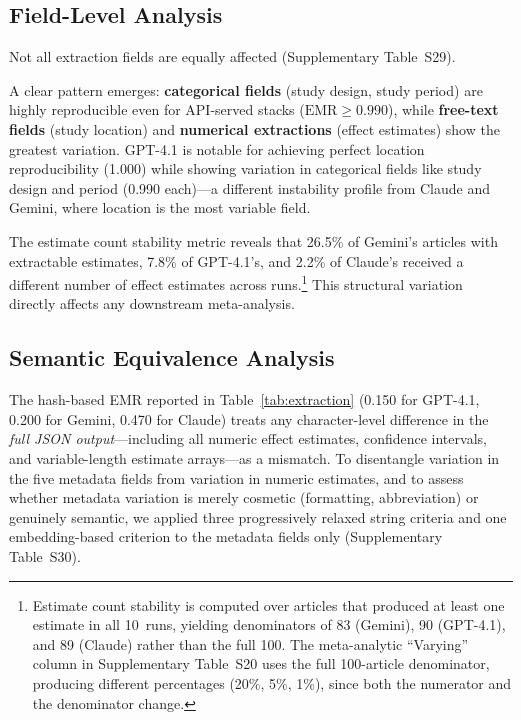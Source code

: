 \documentclass[preprint,review,12pt,authoryear]{elsarticle}
\newcommand{\emr}{\textrm{EMR}}
\begin{document}
\subsection{Field-Level Analysis}
\label{sec:fieldlevel}

Not all extraction fields are equally affected (Supplementary Table~S29).


\noindent A clear pattern emerges: \textbf{categorical fields} (study design, study period) are highly reproducible even for API-served stacks ($\emr{\geq}0.990$), while \textbf{free-text fields} (study location) and \textbf{numerical extractions} (effect estimates) show the greatest variation.
GPT-4.1 is notable for achieving perfect location reproducibility (1.000) while showing variation in categorical fields like study design and period (0.990 each)---a different instability profile from Claude and Gemini, where location is the most variable field.

The estimate count stability metric reveals that 26.5\% of Gemini's articles with extractable estimates, 7.8\% of GPT-4.1's, and 2.2\% of Claude's received a different number of effect estimates across runs.\footnote{Estimate count stability is computed over articles that produced at least one estimate in all 10~runs, yielding denominators of 83 (Gemini), 90 (GPT-4.1), and 89 (Claude) rather than the full 100. The meta-analytic ``Varying'' column in Supplementary Table~S20 uses the full 100-article denominator, producing different percentages (20\%, 5\%, 1\%), since both the numerator and the denominator change.}
This structural variation directly affects any downstream meta-analysis.

\subsection{Semantic Equivalence Analysis}
\label{sec:semantic}

The hash-based EMR reported in Table~\ref{tab:extraction} (0.150 for GPT-4.1, 0.200 for Gemini, 0.470 for Claude) treats any character-level difference in the \emph{full JSON output}---including all numeric effect estimates, confidence intervals, and variable-length estimate arrays---as a mismatch.
To disentangle variation in the five metadata fields from variation in numeric estimates, and to assess whether metadata variation is merely cosmetic (formatting, abbreviation) or genuinely semantic, we applied three progressively relaxed string criteria and one embedding-based criterion to the metadata fields only (Supplementary Table~S30).
\end{document}
